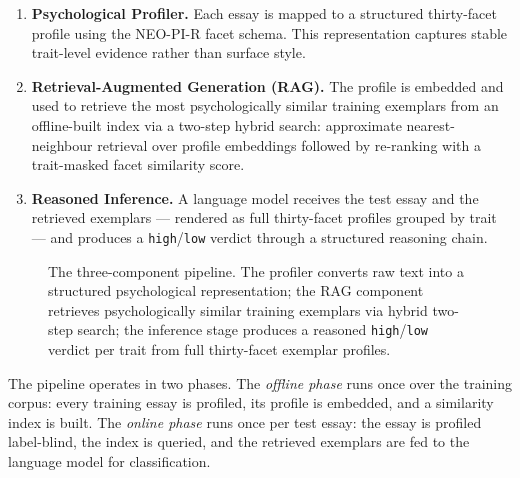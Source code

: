 \documentclass[../main.tex]{subfiles}
\begin{document}
\begin{enumerate}
  \item \textbf{Psychological Profiler.} Each essay is mapped to a structured
    thirty-facet profile using the NEO-PI-R facet schema. This representation
    captures stable trait-level evidence rather than surface style.
  \item \textbf{Retrieval-Augmented Generation (RAG).} The profile is embedded
    and used to retrieve the most psychologically similar training exemplars from
    an offline-built index via a two-step hybrid search: approximate
    nearest-neighbour retrieval over profile embeddings followed by re-ranking
    with a trait-masked facet similarity score.
  \item \textbf{Reasoned Inference.} A language model receives the test essay
    and the retrieved exemplars --- rendered as full thirty-facet profiles grouped
    by trait --- and produces a \texttt{high}/\texttt{low} verdict through a
    structured reasoning chain.
\end{enumerate}

\begin{figure}[ht]
  \centering
  \caption{The three-component pipeline. The profiler converts raw text into a
    structured psychological representation; the RAG component retrieves
    psychologically similar training exemplars via hybrid two-step search; the
    inference stage produces a reasoned \texttt{high}/\texttt{low} verdict per
    trait from full thirty-facet exemplar profiles.}
  \label{fig:pipeline}
\end{figure}

The pipeline operates in two phases. The \emph{offline phase} runs once over
the training corpus: every training essay is profiled, its profile is embedded,
and a similarity index is built. The \emph{online phase} runs once per test
essay: the essay is profiled label-blind, the index is queried, and the
retrieved exemplars are fed to the language model for classification.


\end{document}

